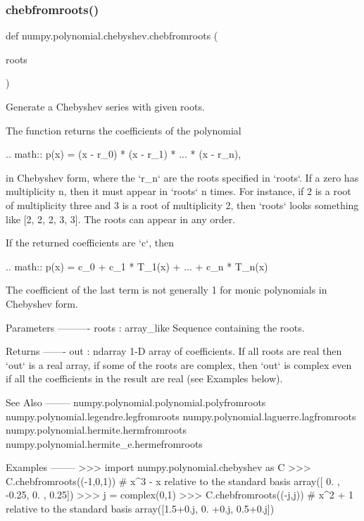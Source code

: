 \subsubsection{\texorpdfstring{chebfromroots()}{chebfromroots()}}
{\footnotesize\ttfamily def numpy.\+polynomial.\+chebyshev.\+chebfromroots (\begin{DoxyParamCaption}\item[{}]{roots }\end{DoxyParamCaption})}

\begin{DoxyVerb}Generate a Chebyshev series with given roots.

The function returns the coefficients of the polynomial

.. math:: p(x) = (x - r_0) * (x - r_1) * ... * (x - r_n),

in Chebyshev form, where the `r_n` are the roots specified in `roots`.
If a zero has multiplicity n, then it must appear in `roots` n times.
For instance, if 2 is a root of multiplicity three and 3 is a root of
multiplicity 2, then `roots` looks something like [2, 2, 2, 3, 3]. The
roots can appear in any order.

If the returned coefficients are `c`, then

.. math:: p(x) = c_0 + c_1 * T_1(x) + ... +  c_n * T_n(x)

The coefficient of the last term is not generally 1 for monic
polynomials in Chebyshev form.

Parameters
----------
roots : array_like
    Sequence containing the roots.

Returns
-------
out : ndarray
    1-D array of coefficients.  If all roots are real then `out` is a
    real array, if some of the roots are complex, then `out` is complex
    even if all the coefficients in the result are real (see Examples
    below).

See Also
--------
numpy.polynomial.polynomial.polyfromroots
numpy.polynomial.legendre.legfromroots
numpy.polynomial.laguerre.lagfromroots
numpy.polynomial.hermite.hermfromroots
numpy.polynomial.hermite_e.hermefromroots

Examples
--------
>>> import numpy.polynomial.chebyshev as C
>>> C.chebfromroots((-1,0,1)) # x^3 - x relative to the standard basis
array([ 0.  , -0.25,  0.  ,  0.25])
>>> j = complex(0,1)
>>> C.chebfromroots((-j,j)) # x^2 + 1 relative to the standard basis
array([1.5+0.j, 0. +0.j, 0.5+0.j])\end{DoxyVerb}
 \mbox{\label{namespacenumpy_1_1polynomial_1_1chebyshev_ab8fd48a4bae89d0481f5fb27ac8116a8}} 
